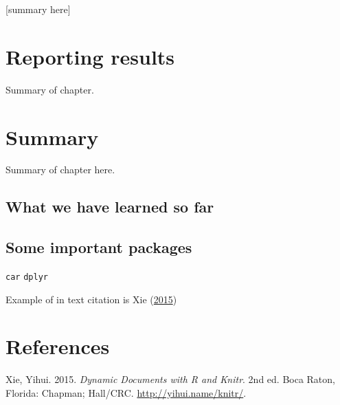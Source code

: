 \documentclass[]{book}
\theoremstyle{definition}
\theoremstyle{definition}
\theoremstyle{remark}
\begin{document}
{[}summary here{]}

\chapter{Reporting results}\label{reporting-results}

Summary of chapter.

\chapter{Summary}\label{summary-3}

Summary of chapter here.

\section{What we have learned so far}\label{what-we-have-learned-so-far}

\section{Some important packages}\label{some-important-packages}

\texttt{car} \texttt{dplyr}

Example of in text citation is Xie
(\protect\hyperlink{ref-xie2015}{2015})

\chapter{References}\label{references}

\hypertarget{refs}{}
\hypertarget{ref-xie2015}{}
Xie, Yihui. 2015. \emph{Dynamic Documents with R and Knitr}. 2nd ed.
Boca Raton, Florida: Chapman; Hall/CRC. \url{http://yihui.name/knitr/}.
\end{document}
